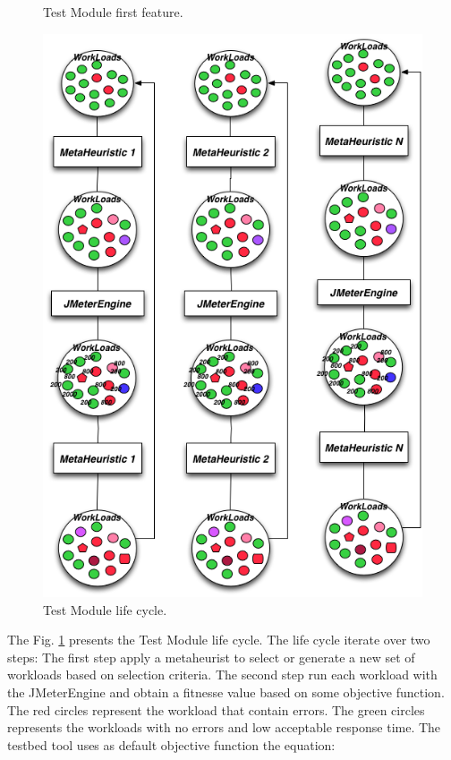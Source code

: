 \documentclass[times]{stvrauth}
\begin{document}
\begin{figure}[h]
\begin{minipage}{.5\textwidth}
\caption{Test Module first feature.}
\label{fig:step1}
\end{minipage}
\begin{minipage}{.5\textwidth}
\centering
\includegraphics[width=1\textwidth]{./images/step2.png}
\caption{Test Module life cycle.}
\label{fig:step2}
\end{minipage}
\end{figure} 

The Fig. \ref{fig:step2} presents the Test Module life cycle. The life cycle iterate over two steps: The first step apply a metaheurist to select or generate a new set of workloads based on selection criteria. The second step run each workload with the JMeterEngine and obtain a fitnesse value based on some objective function. The red circles represent the workload that contain errors. The green circles represents the workloads with no errors and low acceptable response time. The testbed tool uses as default objective function the equation:
\end{document}
